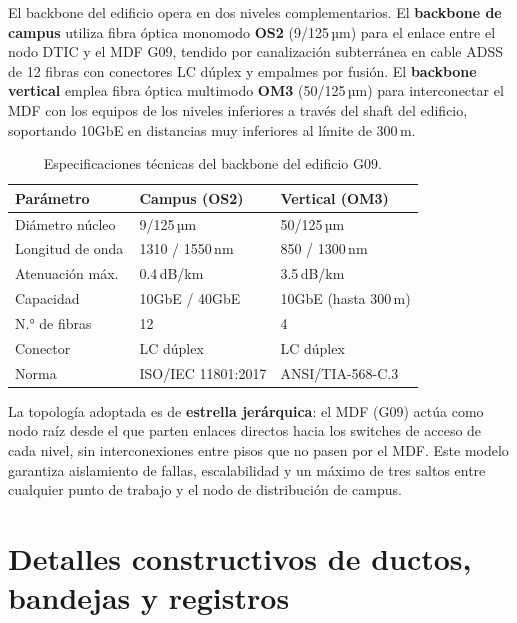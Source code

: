 El backbone del edificio opera en dos niveles complementarios. El
\textbf{backbone de campus} utiliza fibra óptica monomodo \textbf{OS2}
(9/125\,µm) para el enlace entre el nodo DTIC y el MDF G09, tendido por
canalización subterránea en cable ADSS de 12 fibras con conectores LC dúplex
y empalmes por fusión. El \textbf{backbone vertical} emplea fibra óptica
multimodo \textbf{OM3} (50/125\,µm) para interconectar el MDF con los equipos
de los niveles inferiores a través del shaft del edificio, soportando 10GbE
en distancias muy inferiores al límite de 300\,m.

\begin{table}[H]
    \centering
    \caption{Especificaciones técnicas del backbone del edificio G09.}
    \label{tab:backbone_specs}
    \begin{tabular}{|p{4cm}|p{4.5cm}|p{4.5cm}|}
        \hline
        \textbf{Parámetro} & \textbf{Campus (OS2)} & \textbf{Vertical (OM3)} \\
        \hline
        Diámetro núcleo   & 9/125\,µm          & 50/125\,µm \\
        \hline
        Longitud de onda  & 1310 / 1550\,nm    & 850 / 1300\,nm \\
        \hline
        Atenuación máx.\  & 0.4\,dB/km         & 3.5\,dB/km \\
        \hline
        Capacidad         & 10GbE / 40GbE      & 10GbE (hasta 300\,m) \\
        \hline
        N.° de fibras     & 12                 & 4 \\
        \hline
        Conector          & LC dúplex          & LC dúplex \\
        \hline
        Norma             & ISO/IEC 11801:2017 & ANSI/TIA-568-C.3 \\
        \hline
    \end{tabular}
\end{table}

La topología adoptada es de \textbf{estrella jerárquica}: el MDF (G09) actúa
como nodo raíz desde el que parten enlaces directos hacia los switches de acceso
de cada nivel, sin interconexiones entre pisos que no pasen por el MDF. Este
modelo garantiza aislamiento de fallas, escalabilidad y un máximo de tres saltos
entre cualquier punto de trabajo y el nodo de distribución de campus.

\section{Detalles constructivos de ductos, bandejas y registros}
\label{sec:detalles_constructivos}


